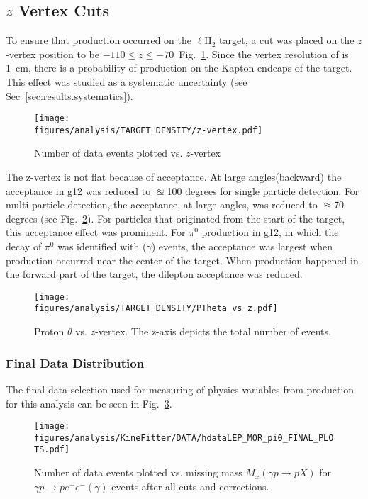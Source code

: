 \FloatBarrier
\subsection{$z$ Vertex Cuts}\label{sec:analysis.zvert}
To ensure that \pizT production occurred on the $\ell$H$_2$ target, a cut was placed on the $z$-vertex position to be $-110 \le z \le -70$~Fig.~\ref{fig:zcut}. Since the vertex resolution of  is 1~cm, there is a probability of \pizT production on the Kapton endcaps of the target. This effect was studied as a systematic uncertainty (see Sec~\ref{sec:results.systematics}). 
\begin{figure}[h!]\begin{center}
\texttt{[image: \\figures/analysis/TARGET\_DENSITY/z-vertex.pdf]}
\caption[Number of data events plotted vs. $z$-vertex]{\label{fig:zcut}Number of data events plotted vs. $z$-vertex}
\end{center}\end{figure}
The z-vertex is not flat because of acceptance. At large angles(backward) the acceptance in g12 was reduced to $\approxeq$100 degrees for single particle detection. For multi-particle detection, the acceptance, at large angles, was reduced to $\approxeq$70 degrees (see Fig.~\ref{fig:Ptheta_z}). For particles that originated from the start of the target, this acceptance effect was prominent. For $\pi^0$ production in g12, in which the decay of $\pi^0$ was identified with \epemT($\gamma$) events, the acceptance was largest when production occurred near the center of the target. When production happened in the forward part of the target, the dilepton acceptance was reduced. 

\begin{figure}[h!]\begin{center}
\texttt{[image: \\figures/analysis/TARGET\_DENSITY/PTheta\_vs\_z.pdf]}
\caption[Proton $\theta$ vs. $z$-vertex]{\label{fig:Ptheta_z}Proton $\theta$ vs. $z$-vertex. The z-axis depicts the total number of events.}
\end{center}\end{figure}
\FloatBarrier
\subsubsection{Final Data Distribution}\label{sec.final.data}
The final data selection used for measuring of physics variables from \pizT production for this analysis can be seen in Fig.~\ref{fig:kinfit.final.plot}.

\begin{figure}[h!]\begin{center}
\texttt{[image: \\figures/analysis/KineFitter/DATA/hdataLEP\_MOR\_pi0\_FINAL\_PLOTS.pdf]}
\caption[Number of data events plotted vs. missing mass $M_x(\gamma p \to p X)$ for $\gamma p \to p e^+ e^- (\gamma)$ events after all cuts and corrections.]{\label{fig:kinfit.final.plot}Number of data events plotted vs. missing mass $M_x(\gamma p \to p X)$ for $\gamma p \to p e^+ e^- (\gamma)$ events after all cuts and corrections.}
\end{center}\end{figure}
\FloatBarrier
